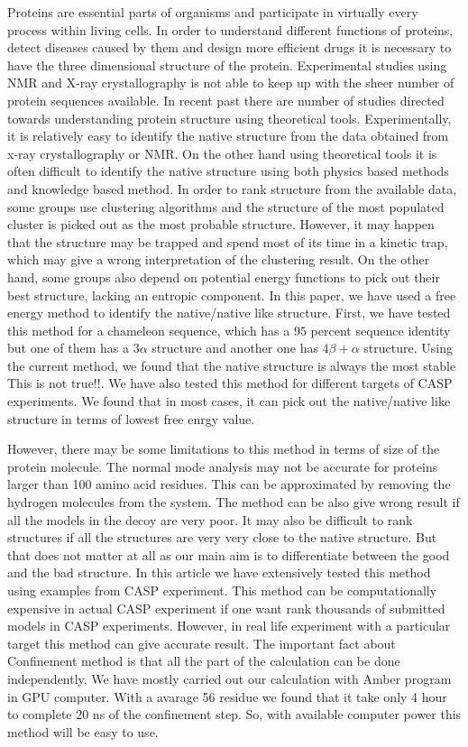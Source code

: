 \documentclass[12pt]{article}
\newcommand{\Alberto}[1]{\color{ForestGreen}#1\normalcolor }
\begin{document}
Proteins are essential parts of organisms and participate in virtually every process within living cells. 
In order to understand different functions of proteins, detect diseases caused by them and design more efficient drugs 
it is necessary to have the three dimensional structure of the protein. Experimental studies using NMR and X-ray crystallography is 
not able to keep up with the sheer number of protein sequences available. In recent past there are number of studies directed towards understanding protein 
structure using theoretical tools. Experimentally, it is relatively easy to identify the native structure from the data obtained 
from x-ray crystallography or NMR. On the other hand using theoretical tools it is often difficult to identify the native structure 
using both physics based methods and knowledge based method. In order to rank structure from the available data, some groups use 
clustering algorithms and the structure of the
most populated cluster is picked out as the most probable structure. However, it may happen that the structure may be trapped and 
spend most of its time in a kinetic trap, which may give a wrong interpretation of the clustering result. On the other hand, some groups
also depend on potential energy functions to pick out their best structure, lacking an entropic
component. In this paper, we have used a free energy method to identify
the native/native like structure. First, we have tested this method for a chameleon sequence, which has a $95$ percent sequence identity
but one of them has a $3 \alpha$ structure and another one has $4 \beta + \alpha$ structure. Using the current method, we found that 
the native structure is always the most stable \Alberto{This is not true!!}. We have also tested this method for different targets of CASP experiments. We found
that in most cases, it can pick out the native/native like structure in terms of lowest free enrgy value. 

However, there may be some limitations to this method in terms of size of the protein molecule. The normal mode analysis may not be
accurate for proteins larger than 100 amino acid residues. This can be approximated by removing the hydrogen molecules from 
the system. 
The method can be also give wrong result if all the models in the decoy are very poor. It may also be difficult to rank structures if 
all the structures are very very close to the native structure. But that does not matter at all as our main aim is to differentiate
between the good and the bad structure. In this article we have extensively tested this method using examples from CASP experiment.
This method can be computationally expensive in actual CASP experiment if one want rank thousands of submitted models in CASP 
experiments. However, in real life experiment with a particular target this method can give accurate result. The important 
fact about Confinement method is that all the part of the calculation can be done independently. We have mostly carried out 
our calculation with Amber program \cite{Case2005} in GPU computer. With a avarage 56 residue we found that it take only 4 hour to complete 
20 ns of the confinement step. So, with available computer power this method will be easy to use.  
 
\end{document}
